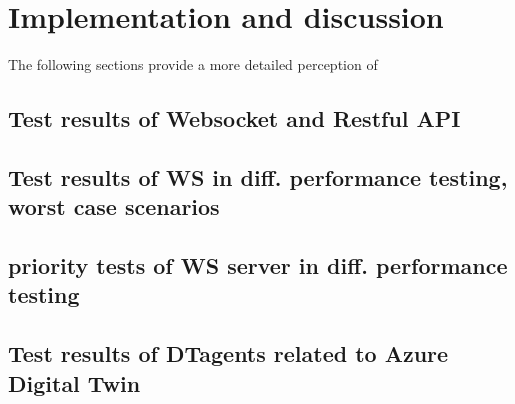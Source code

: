 \chapter{Implementation and discussion} \label{chap: Result}

The following sections provide a more detailed perception of 































\section{Test results of Websocket and Restful API} \label{chap: Result-Websocket}

\section{Test results of WS in diff. performance testing, worst case scenarios} \label{chap: Result-WS}

\section{priority tests of WS server in diff. performance testing} \label{chap: Result-priority}

\section{Test results of DTagents related to Azure Digital Twin} \label{chap: Result-DT}
